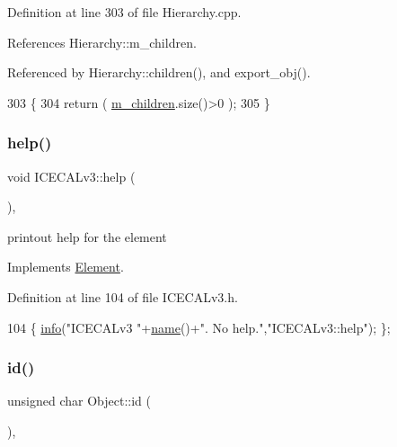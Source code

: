 Definition at line 303 of file Hierarchy.\+cpp.



References Hierarchy\+::m\+\_\+children.



Referenced by Hierarchy\+::children(), and export\+\_\+obj().


\begin{DoxyCode}
303                               \{
304   \textcolor{keywordflow}{return} ( \hyperlink{classHierarchy_a038816763941fd4a930504917f60483b}{m\_children}.size()>0 );
305 \}
\end{DoxyCode}
\mbox{\label{classICECALv3_a00e572849b4952e7cf04a39f992df037}} 
\subsubsection{\texorpdfstring{help()}{help()}}
{\footnotesize\ttfamily void I\+C\+E\+C\+A\+Lv3\+::help (\begin{DoxyParamCaption}{ }\end{DoxyParamCaption})\hspace{0.3cm}{\ttfamily [inline]}, {\ttfamily [virtual]}}

printout help for the element 

Implements \hyperlink{classElement_a32c0de27acb08e17251cef88c3e9303a}{Element}.



Definition at line 104 of file I\+C\+E\+C\+A\+Lv3.\+h.


\begin{DoxyCode}
104 \{ \hyperlink{classObject_a644fd329ea4cb85f54fa6846484b84a8}{info}(\textcolor{stringliteral}{"ICECALv3 "}+\hyperlink{classObject_a300f4c05dd468c7bb8b3c968868443c1}{name}()+\textcolor{stringliteral}{". No help."},\textcolor{stringliteral}{"ICECALv3::help"}); \};
\end{DoxyCode}
\mbox{\label{classObject_af99145335cc61ff6e2798ea17db009d2}} 
\subsubsection{\texorpdfstring{id()}{id()}}
{\footnotesize\ttfamily unsigned char Object\+::id (\begin{DoxyParamCaption}{ }\end{DoxyParamCaption})\hspace{0.3cm}{\ttfamily [inline]}, {\ttfamily [inherited]}}



